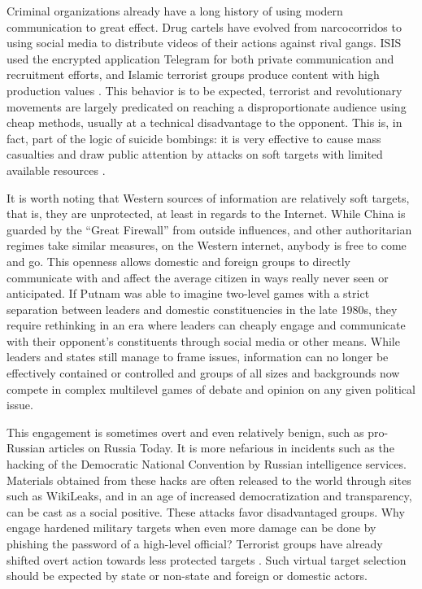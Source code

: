 \documentclass[doublespacing]{utdthesis}
\let\cite=\citep
\begin{document}
Criminal organizations already have a long history of using modern communication to great effect.
Drug cartels have evolved from narcocorridos to using social media to distribute videos of their actions against rival gangs.
ISIS used the encrypted application Telegram for both private communication and recruitment efforts, and Islamic terrorist groups produce content with high production values \cite{bloom2019navigating}.
This behavior is to be expected, terrorist and revolutionary movements are largely predicated on reaching a disproportionate audience using cheap methods, usually at a technical disadvantage to the opponent.
This is, in fact, part of the logic of suicide bombings: it is very effective to cause mass casualties and draw public attention by attacks on soft targets with limited available resources \cite{bloom2004}.

It is worth noting that Western sources of information are relatively soft targets, that is, they are unprotected, at least in regards to the Internet. While China is guarded by the “Great Firewall” from outside influences, and other authoritarian regimes take similar measures, on the Western internet,
anybody is free to come and go.
This openness allows domestic and foreign groups to directly communicate with and affect the average citizen in ways really never seen or anticipated.
If Putnam \citeyear{putnam1988} was able to imagine two-level games with a strict separation between leaders and domestic constituencies in the late 1980s, they require rethinking in an era where leaders can cheaply engage and communicate with their opponent’s constituents through social media or other means.
While leaders and states still manage to frame issues, information can no longer be effectively contained or controlled and groups of all sizes and backgrounds now compete in complex multilevel games of debate and opinion on any given political issue.

This engagement is sometimes overt and even relatively benign, such as pro-Russian articles on Russia Today.
It is more nefarious in incidents such as the hacking of the Democratic National
Convention by Russian intelligence services.
Materials obtained from these hacks are often released to the world through sites such as WikiLeaks, and in an age of increased democratization and transparency, can be cast as a social positive.
These attacks favor disadvantaged groups.
Why engage hardened military targets when even more damage can be done by phishing the password of a high-level official?
Terrorist groups have already shifted overt action towards less protected targets \cite[p. 215]{brandt2010}.
Such virtual target selection should be expected by state or non-state and foreign or domestic actors.
\end{document}

